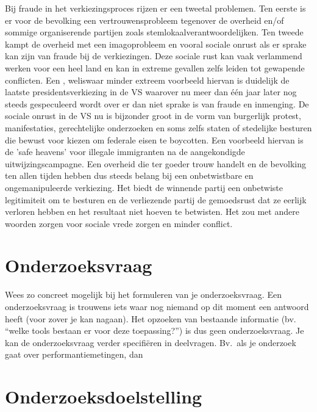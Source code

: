 Bij fraude in het verkiezingsproces rijzen er een tweetal problemen. Ten eerste is er voor de bevolking een vertrouwensprobleem tegenover de overheid en/of sommige organiserende partijen zoals stemlokaalverantwoordelijken. 
\newline
\newline
Ten tweede kampt de overheid met een imagoprobleem en vooral sociale onrust als er sprake kan zijn van fraude bij de verkiezingen. Deze sociale rust kan vaak verlammend werken voor een heel land en kan in extreme gevallen zelfs leiden tot gewapende conflicten. Een , weliswaar minder extreem voorbeeld hiervan is duidelijk de laatste presidentsverkiezing in de VS waarover nu meer dan één jaar later nog steeds gespeculeerd wordt over er dan niet sprake is van fraude en inmenging. De sociale onrust in de VS nu is bijzonder groot in de vorm van burgerlijk protest, manifestaties, gerechtelijke onderzoeken en soms zelfs staten of stedelijke besturen die bewust voor kiezen om federale eisen te boycotten. Een voorbeeld hiervan is de 'safe heavens' voor illegale immigranten na de aangekondigde uitwijzingscampagne. \newline
\newline
Een overheid die ter goeder trouw handelt en de bevolking ten allen tijden hebben dus steeds belang bij een onbetwistbare en ongemanipuleerde verkiezing. Het biedt de winnende partij een onbetwiste legitimiteit om te besturen en de verliezende partij de gemoedsrust dat ze eerlijk verloren hebben en het resultaat niet hoeven te betwisten. Het zou met andere woorden zorgen voor sociale vrede zorgen en minder conflict. 


\section{Onderzoeksvraag}
\label{sec:onderzoeksvraag}

Wees zo concreet mogelijk bij het formuleren van je onderzoeksvraag. Een onderzoeksvraag is trouwens iets waar nog niemand op dit moment een antwoord heeft (voor zover je kan nagaan). Het opzoeken van bestaande informatie (bv. ``welke tools bestaan er voor deze toepassing?'') is dus geen onderzoeksvraag. Je kan de onderzoeksvraag verder specifiëren in deelvragen. Bv.~als je onderzoek gaat over performantiemetingen, dan 

\section{Onderzoeksdoelstelling}
\label{sec:onderzoeksdoelstelling}


